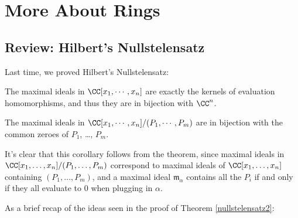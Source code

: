 \section{More About Rings}

\subsection{Review: Hilbert's Nullstelensatz}

Last time, we proved Hilbert's Nullstelensatz:

\begin{theorem} \label{nullstelensatz2}
The maximal ideals in $\CC[x_1, \cdots, x_n]$ are exactly the kernels of evaluation homomorphisms, and thus they are in bijection with $\CC^n$.
\end{theorem}

\begin{corollary} \label{nullstelensatz corollary}
The maximal ideals in $\CC[x_1, \cdots, x_n]/(P_1, \cdots, P_m)$ are in bijection with the common zeroes of $P_1$, \ldots, $P_m$.
\end{corollary}

It's clear that this corollary follows from the theorem, since maximal ideals in $\CC[x_1, \ldots, x_n]/(P_1, \ldots, P_m)$ correspond to maximal ideals of $\CC[x_1, \ldots, x_n]$ containing $(P_1, \ldots, P_m)$, and a maximal ideal $\mathfrak{m}_\alpha$ contains all the $P_i$ if and only if they all evaluate to $0$ when plugging in $\alpha$. 

As a brief recap of the ideas seen in the proof of Theorem \ref{nullstelensatz2}: 

